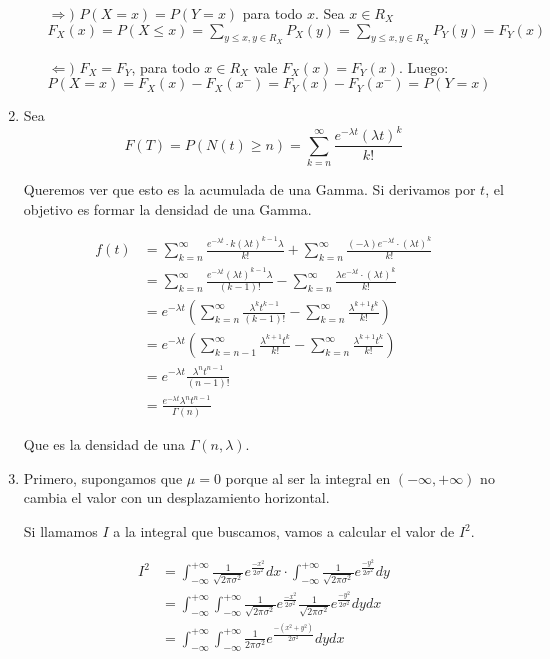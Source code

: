 \begin{enumerate}
    \begin{itemize}
      \item[$\Rightarrow)$] $P(X = x) = P(Y = x)$ para todo $x$. Sea $x \in R_X$ \\
                            $F_X(x) = P(X \leq x) = \sum_{y \leq x, y \in R_X }^{} P_X(y) =  \sum_{y \leq x, y \in R_X }^{} P_Y(y) = F_Y(x) $
      \item[$\Leftarrow)$]  $F_X = F_Y$, para todo $x \in R_X $ vale $F_X(x) = F_Y(x)$. Luego: \\
                            $P(X=x) = F_X(x) - F_X(x^{-}) = F_Y(x) - F_Y(x^{-}) = P(Y=x)$
    \end{itemize}
    
	\item
		Sea $$F(T) = P(N(t) \geq n) = \sum_{k=n}^{\infty}\frac{e^{-\lambda t}(\lambda t)^k}{k!}$$
		
		Queremos ver que esto es la acumulada de una Gamma. Si derivamos por $t$, el objetivo es formar la densidad de una Gamma.
		
		\begin{align*}
			f(t)	& = \sum_{k=n}^{\infty}\frac{e^{-\lambda t}\cdot k(\lambda t)^{k-1}\lambda}{k!} + \sum_{k=n}^{\infty}\frac{(-\lambda)e^{-\lambda t}\cdot(\lambda t)^k}{k!}	\\
					& = \sum_{k=n}^{\infty}\frac{e^{-\lambda t}(\lambda t)^{k-1}\lambda}{(k-1)!} - \sum_{k=n}^{\infty}\frac{\lambda e^{-\lambda t}\cdot(\lambda t)^k}{k!}		\\
					& = e^{-\lambda t} \left(\sum_{k=n}^{\infty}\frac{\lambda^k t^{k-1}}{(k-1)!} - \sum_{k=n}^{\infty}\frac{\lambda^{k+1} t^k}{k!}\right)						\\
					& = e^{-\lambda t} \left(\sum_{k=n-1}^{\infty}\frac{\lambda^{k+1} t^k}{k!} - \sum_{k=n}^{\infty}\frac{\lambda^{k+1} t^k}{k!}\right)						\\
					& = e^{-\lambda t} \frac{\lambda^{n} t^{n-1}}{(n-1)!}	\\
					& = \frac{e^{-\lambda t}\lambda^{n} t^{n-1}}{\Gamma(n)}
		\end{align*}
		
		Que es la densidad de una $\Gamma(n, \lambda)$.
	\item
		Primero, supongamos que $\mu=0$ porque al ser la integral en $(-\infty, +\infty)$ no cambia el valor con un desplazamiento horizontal.
		
		Si llamamos $I$ a la integral que buscamos, vamos a calcular el valor de $I^2$.
		
		\begin{align*}
			I^2	& = \int_{-\infty}^{+\infty} \frac{1}{\sqrt{2\pi \sigma^2}}e^{\frac{-x^2}{2\sigma^2}} dx	\cdot \int_{-\infty}^{+\infty} \frac{1}{\sqrt{2\pi \sigma^2}}e^{\frac{-y^2}{2\sigma^2}} dy	\\
				& = \int_{-\infty}^{+\infty} \int_{-\infty}^{+\infty} \frac{1}{\sqrt{2\pi \sigma^2}}e^{\frac{-x^2}{2\sigma^2}} \frac{1}{\sqrt{2\pi \sigma^2}}e^{\frac{-y^2}{2\sigma^2}} dy dx			\\
				& = \int_{-\infty}^{+\infty} \int_{-\infty}^{+\infty} \frac{1}{2\pi \sigma^2} e^{\frac{-(x^2+y^2)}{2\sigma^2}} dy dx
		\end{align*}
		

\end{enumerate}
